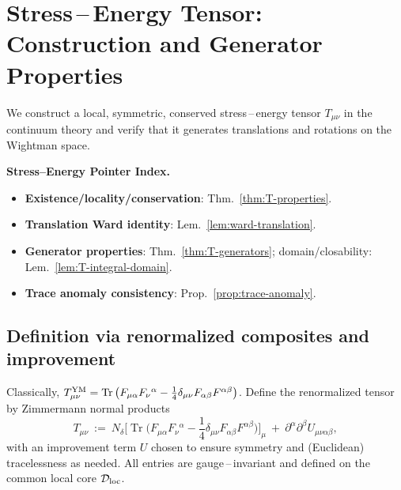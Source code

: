 \documentclass[11pt]{amsart}
\theoremstyle{plain}
\theoremstyle{definition}
\theoremstyle{remark}
\DeclareMathOperator{\Tr}{Tr}
\renewcommand{\tfrac}[2]{\textstyle\frac{#1}{#2}}
\begin{document}
\section{Stress\,–\,Energy Tensor: Construction and Generator Properties}
\label{sec:stress-energy}

We construct a local, symmetric, conserved stress\,–\,energy tensor $T_{\mu\nu}$ in the continuum theory and verify that it generates translations and rotations on the Wightman space.

\begin{mdframed}[linewidth=0.6pt, linecolor=black!30, backgroundcolor=yellow!3, roundcorner=2pt, innertopmargin=6pt, innerbottommargin=6pt, skipabove=8pt, skipbelow=8pt]
\textbf{Stress–Energy Pointer Index.}
\begin{itemize}[leftmargin=2em, itemsep=3pt]
  \item \textbf{Existence/locality/conservation}: Thm.~\ref{thm:T-properties}.
  \item \textbf{Translation Ward identity}: Lem.~\ref{lem:ward-translation}.
  \item \textbf{Generator properties}: Thm.~\ref{thm:T-generators}; domain/closability: Lem.~\ref{lem:T-integral-domain}.
  \item \textbf{Trace anomaly consistency}: Prop.~\ref{prop:trace-anomaly}.
\end{itemize}
\end{mdframed}

\subsection{Definition via renormalized composites and improvement}
Classically, $T_{\mu\nu}^{\rm YM}=\Tr\big(F_{\mu\alpha}F_{\nu}{}^{\alpha}-\tfrac14\delta_{\mu\nu}F_{\alpha\beta}F^{\alpha\beta}\big)$. Define the renormalized tensor by Zimmermann normal products
\[
  T_{\mu\nu}\ :=\ N_\delta\Big[\Tr\Big(F_{\mu\alpha}F_{\nu}{}^{\alpha}-\tfrac14\delta_{\mu\nu}F_{\alpha\beta}F^{\alpha\beta}\Big)\Big]_\mu\ +\ \partial^{\alpha}\partial^{\beta}U_{\mu\nu\alpha\beta},
\]
with an improvement term $U$ chosen to ensure symmetry and (Euclidean) tracelessness as needed. All entries are gauge\,–\,invariant and defined on the common local core $\mathcal D_{\rm loc}$.
\end{document}
